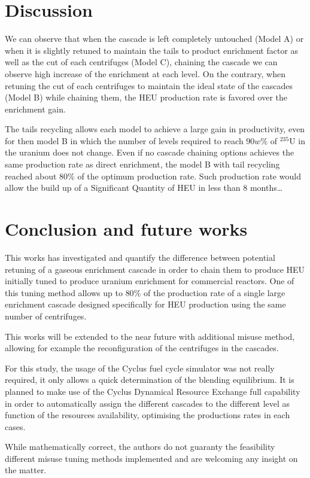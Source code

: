 \section{Discussion}

We can observe that when the cascade is left completely untouched (Model A) or
when it is slightly retuned to maintain the tails to product enrichment factor
as well as the cut of each centrifuges (Model C), chaining the cascade we can
observe high increase of the enrichment at each level.  On the contrary, when
retuning the cut of each centrifuges to maintain the ideal state of the cascades
(Model B) while chaining them, the \gls{HEU} production rate is favored over the
enrichment gain.

The tails recycling allows each model to achieve a large gain in productivity,
even for then model B in which the number of levels required to reach $90w\%$ of
$^{235}$U in the uranium does not change. Even if no cascade chaining options
achieves the same production rate as direct enrichment, the model B with tail
recycling reached about $80\%$ of the optimum production rate. Such production
rate would allow the build up of a Significant Quantity of \gls{HEU} in less
than 8 months\ldots


\section{Conclusion and future works}

This works has investigated and quantify the difference between potential
retuning of a gaseous enrichment cascade in order to chain them to produce
\gls{HEU} initially tuned to produce uranium enrichment for commercial reactors.
One of this tuning method allows up to $80\%$ of the production rate of a single
large enrichment cascade designed specifically for \gls{HEU} production using
the same number of centrifuges.

This works will be extended to the near future with additional misuse method,
allowing for example the reconfiguration of the centrifuges in the cascades.

For this study, the usage of the Cyclus fuel cycle simulator was not really
required, it only allows a quick determination of the blending equilibrium. It
is planned to make use of the Cyclus Dynamical Resource Exchange full capability
in order to automatically assign the different cascades to the different level
as function of the resources availability, optimising the productions rates in
each cases.

While mathematically correct, the authors do not guaranty the feasibility
different misuse tuning methods implemented and are welcoming any insight on the
matter.


